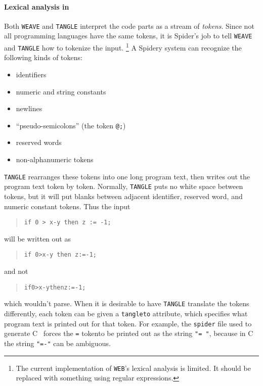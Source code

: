\paragraph{Lexical analysis in {\WEB}}
Both {\tt WEAVE} and {\tt TANGLE} interpret the code parts as a stream
of {\em tokens}.
Since not all programming languages have the same tokens, it is 
{Spider}'s job to tell {\tt WEAVE} and {\tt TANGLE} how to tokenize the
input.%
\footnote{%
The current implementation of {\tt WEB}'s lexical analysis is limited.
It should be replaced with something using regular
expressions.%
}
A Spidery {\WEB} system can recognize the following kinds of
tokens:
\begin{itemize}
\item identifiers
\item numeric and string constants
\item newlines
\item ``pseudo-semicolons'' (the token {\tt @;})
\item reserved words
\item non-alphanumeric tokens
\end{itemize}

{\tt TANGLE} rearranges these tokens into one long program
text, then writes out the program text token by token.
Normally, {\tt TANGLE} puts no white space between tokens, but it
will put blanks between adjacent identifier, reserved word, and
numeric constant tokens.
Thus the input
\begin{quote}
\tt if 0 > x-y then z := -1;
\end{quote}
will be written out as
\begin{quote}
\tt if 0>x-y then z:=-1;
\end{quote}
and not
\begin{quote}
\tt if0>x-ythenz:=-1;
\end{quote}
which wouldn't parse.
When it is desirable to have {\tt TANGLE} translate
the tokens differently, each token can be given a {\tt tangleto}
attribute, which specifies what  program text is printed out for that
token.
For example, 
the {\tt spider} file used to generate C~{\WEB} forces the {\tt =}
tokento be printed out as the string {\tt "=\ "}, because in C the string
{\tt "=-"} can be ambiguous.

